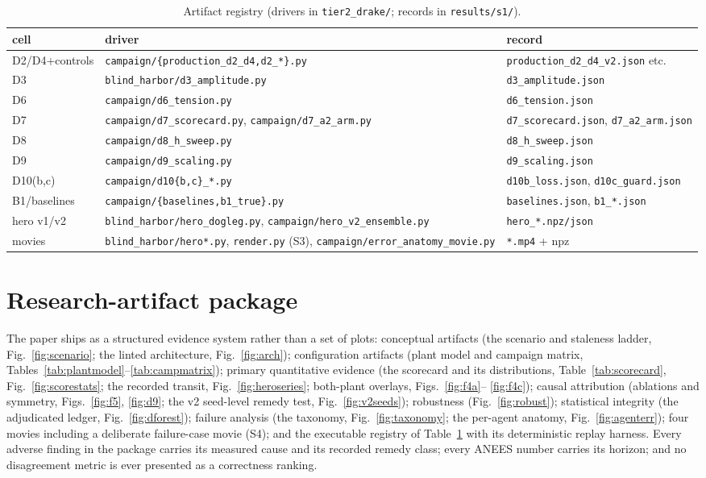 \documentclass[letterpaper, 10pt, journal]{IEEEtran}
\begin{document}
\begin{table}[t]
\centering
\caption{Artifact registry (drivers in \texttt{tier2\_drake/}; records in
\texttt{results/s1/}).}
\label{tab:registry}
\begin{tabular}{lll}
\toprule
cell & driver & record \\
\midrule
D2/D4+controls & \texttt{campaign/\{production\_d2\_d4,d2\_*\}.py} &
\texttt{production\_d2\_d4\_v2.json} etc. \\
D3 & \texttt{blind\_harbor/d3\_amplitude.py} & \texttt{d3\_amplitude.json} \\
D6 & \texttt{campaign/d6\_tension.py} & \texttt{d6\_tension.json} \\
D7 & \texttt{campaign/d7\_scorecard.py}, \texttt{campaign/d7\_a2\_arm.py} &
\texttt{d7\_scorecard.json}, \texttt{d7\_a2\_arm.json} \\
D8 & \texttt{campaign/d8\_h\_sweep.py} & \texttt{d8\_h\_sweep.json} \\
D9 & \texttt{campaign/d9\_scaling.py} & \texttt{d9\_scaling.json} \\
D10(b,c) & \texttt{campaign/d10\{b,c\}\_*.py} & \texttt{d10b\_loss.json},
\texttt{d10c\_guard.json} \\
B1/baselines & \texttt{campaign/\{baselines,b1\_true\}.py} &
\texttt{baselines.json}, \texttt{b1\_*.json} \\
hero v1/v2 & \texttt{blind\_harbor/hero\_dogleg.py},
\texttt{campaign/hero\_v2\_ensemble.py} & \texttt{hero\_*.npz/json} \\
movies & \texttt{blind\_harbor/hero*.py}, \texttt{render.py} (S3),
\texttt{campaign/error\_anatomy\_movie.py} & \texttt{*.mp4} + npz \\
\bottomrule
\end{tabular}
\end{table}

\section{Research-artifact package}
The paper ships as a structured evidence system rather than a set of plots:
conceptual artifacts (the scenario and staleness ladder,
Fig.~\ref{fig:scenario}; the linted architecture, Fig.~\ref{fig:arch});
configuration artifacts (plant model and campaign matrix,
Tables~\ref{tab:plantmodel}--\ref{tab:campmatrix}); primary quantitative
evidence (the scorecard and its distributions,
Table~\ref{tab:scorecard}, Fig.~\ref{fig:scorestats}; the recorded transit,
Fig.~\ref{fig:heroseries}; both-plant overlays, Figs.~\ref{fig:f4a}--%
\ref{fig:f4c}); causal attribution (ablations and symmetry,
Figs.~\ref{fig:f5}, \ref{fig:d9}; the v2 seed-level remedy test,
Fig.~\ref{fig:v2seeds}); robustness (Fig.~\ref{fig:robust}); statistical
integrity (the adjudicated ledger, Fig.~\ref{fig:dforest}); failure
analysis (the taxonomy, Fig.~\ref{fig:taxonomy}; the per-agent anatomy,
Fig.~\ref{fig:agenterr}); four movies including a deliberate failure-case
movie (S4); and the executable registry of Table~\ref{tab:registry} with
its deterministic replay harness. Every adverse finding in the package
carries its measured cause and its recorded remedy class; every ANEES
number carries its horizon; and no disagreement metric is ever presented as
a correctness ranking.
\end{document}
